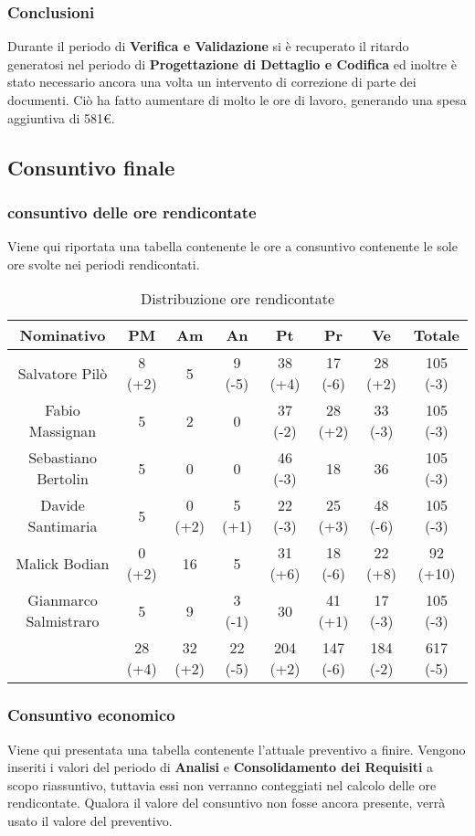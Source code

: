 		\subsubsection{Conclusioni}
		Durante il periodo di \textbf{Verifica e Validazione} si è recuperato il ritardo generatosi nel periodo di \textbf{Progettazione di Dettaglio e Codifica} ed inoltre è stato necessario ancora una volta un intervento di correzione di parte dei documenti. Ciò ha fatto aumentare di molto le ore di lavoro, generando una spesa aggiuntiva di 581€.
	\subsection{Consuntivo finale}
	\subsubsection{consuntivo delle ore rendicontate}
	Viene qui riportata una tabella contenente le ore a consuntivo contenente le sole ore svolte nei periodi rendicontati.
	\begin{table}[H]
		\centering
		\begin{tabular}{|c|c|c|c|c|c|c|c|}
			\hline
			\textbf{Nominativo}		& \textbf{PM}	& \textbf{Am}	& \textbf{An}	& \textbf{Pt}	& \textbf{Pr}	& \textbf{Ve}	& \textbf{Totale}     \\
			\hline
			Salvatore Pilò			& 8 (+2) 	& 5		& 9 (-5)	& 38 (+4) 	& 17 (-6)  	& 28 (+2)  	& 105  (-3) \\
			Fabio Massignan			& 5		& 2		& 0  	& 37 (-2) 	& 28 (+2) 	& 33 (-3) 	& 105  (-3) \\
			Sebastiano Bertolin		& 5		& 0		& 0		& 46 (-3)  	& 18	& 36	& 105  (-3) \\
			Davide Santimaria		& 5		& 0 (+2)	& 5	(+1)	& 22 (-3)	& 25 (+3)  	& 48 (-6) 	& 105  (-3) \\
			Malick Bodian			& 0 (+2)	& 16 	& 5		& 31 (+6) 	& 18 (-6)  	& 22 (+8) 	& 92  (+10) \\
			Gianmarco Salmistraro	& 5		& 9		& 3	(-1) 	& 30	& 41 (+1)  	& 17 (-3) 	& 105  (-3) \\
			\hline
			\textbf{Totale			& 28 (+4)	& 32 (+2)	& 22 (-5)	& 204 (+2)	& 147 (-6)	& 184 (-2)	& 617 (-5)}	\\
			\hline
		\end{tabular}
		\caption{Distribuzione ore rendicontate}
	\end{table}
	\subsubsection{Consuntivo economico}
	Viene qui presentata una tabella contenente l'attuale preventivo a finire. Vengono inseriti i valori del periodo di \textbf{Analisi} e \textbf{Consolidamento dei Requisiti} a scopo riassuntivo, tuttavia essi non verranno conteggiati nel calcolo delle ore rendicontate. Qualora il valore del consuntivo non fosse ancora presente, verrà usato il valore del preventivo.\\
	
